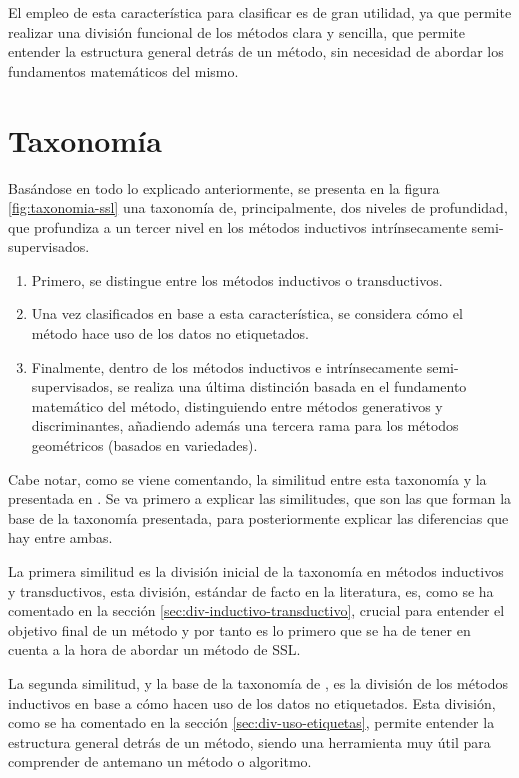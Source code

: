 El empleo de esta característica para clasificar es de gran utilidad, ya que permite realizar una división funcional de los métodos clara y sencilla, que permite entender la estructura general detrás de un método, sin necesidad de abordar los fundamentos matemáticos del mismo.

\section{Taxonomía}

Basándose en todo lo explicado anteriormente, se presenta en la figura \ref{fig:taxonomia-ssl} una taxonomía de, principalmente, dos niveles de profundidad, que profundiza a un tercer nivel en los métodos inductivos intrínsecamente semi-supervisados.

\begin{enumerate}
    \item Primero, se distingue entre los métodos inductivos o transductivos.
    \item Una vez clasificados en base a esta característica, se considera cómo el método hace uso de los datos no etiquetados.
    \item Finalmente, dentro de los métodos inductivos e intrínsecamente semi-supervisados, se realiza una última distinción basada en el fundamento matemático del método, distinguiendo entre métodos generativos y discriminantes, añadiendo además una tercera rama para los métodos geométricos (basados en variedades).
\end{enumerate}

Cabe notar, como se viene comentando, la similitud entre esta taxonomía y la presentada en \citet{van2020survey}. Se va primero a explicar las similitudes, que son las que forman la base de la taxonomía presentada, para posteriormente explicar las diferencias que hay entre ambas.

La primera similitud es la división inicial de la taxonomía en métodos inductivos y transductivos, esta división, estándar de facto en la literatura, es, como se ha comentado en la sección \ref{sec:div-inductivo-transductivo}, crucial para entender el objetivo final de un método y por tanto es lo primero que se ha de tener en cuenta a la hora de abordar un método de \gls{SSL}. 

La segunda similitud, y la base de la taxonomía de \citet{van2020survey}, es la división de los métodos inductivos en base a cómo hacen uso de los datos no etiquetados. Esta división, como se ha comentado en la sección \ref{sec:div-uso-etiquetas}, permite entender la estructura general detrás de un método, siendo una herramienta muy útil para comprender de antemano un método o algoritmo.  

